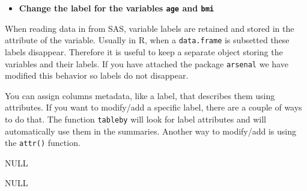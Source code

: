 \documentclass[
]{book}
\newenvironment{Shaded}{\begin{snugshade}}{\end{snugshade}}
\newcommand{\CommentTok}[1]{\textcolor[rgb]{0.56,0.35,0.01}{\textit{#1}}}
\newcommand{\ErrorTok}[1]{\textcolor[rgb]{0.64,0.00,0.00}{\textbf{#1}}}
\newcommand{\KeywordTok}[1]{\textcolor[rgb]{0.13,0.29,0.53}{\textbf{#1}}}
\newcommand{\NormalTok}[1]{#1}
\newcommand{\OperatorTok}[1]{\textcolor[rgb]{0.81,0.36,0.00}{\textbf{#1}}}
\newcommand{\StringTok}[1]{\textcolor[rgb]{0.31,0.60,0.02}{#1}}
\providecommand{\tightlist}{%
  \setlength{\itemsep}{0pt}\setlength{\parskip}{0pt}}
\begin{document}
\begin{itemize}
\tightlist
\item
  \textbf{Change the label for the variables \texttt{age} and \texttt{bmi}}
\end{itemize}

When reading data in from SAS, variable labels are retained and stored in the attribute of the variable. Usually in R, when a \texttt{data.frame} is subsetted these labels disappear. Therefore it is useful to keep a separate object storing the variables and their labels. If you have attached the package \texttt{arsenal} we have modified this behavior so labels do not disappear.

You can assign columns metadata, like a label, that describes them using attributes. If you want to modify/add a specific label, there are a couple of ways to do that. The function \texttt{tableby} will look for label attributes and will automatically use them in the summaries. Another way to modify/add is using the \texttt{attr()} function.

\begin{Shaded}
\end{Shaded}

NULL

\begin{Shaded}
\end{Shaded}

NULL

\begin{Shaded}
\end{Shaded}
\end{document}
